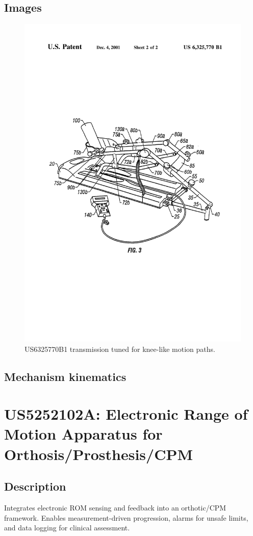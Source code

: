 \documentclass[11pt]{article}
\begin{document}
\subsection{Images}
\begin{figure}[H]
  \centering
  \includegraphics[width=0.54\linewidth]{US6325770B1_1.png}
  \caption{US6325770B1 transmission tuned for knee-like motion paths.}
  \label{fig:US6325770B1}
\end{figure}

\subsection{Mechanism kinematics}

\section{US5252102A: Electronic Range of Motion Apparatus for Orthosis/Prosthesis/CPM}
\subsection{Description}
Integrates electronic ROM sensing and feedback into an orthotic/CPM framework. Enables measurement-driven progression, alarms for unsafe limits, and data logging for clinical assessment.
\end{document}
